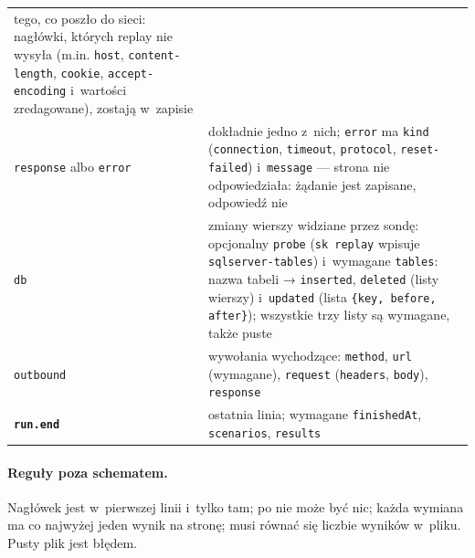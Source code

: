 {\begin{xltabular}{\linewidth}{@{}>{\raggedright\arraybackslash}p{3.6cm} >{\raggedright\arraybackslash}X@{}}
tego, co poszło do sieci: nagłówki, których replay nie wysyła (m.in. \texttt{host},
\texttt{content-length}, \texttt{cookie}, \texttt{accept-encoding} i~wartości zredagowane), zostają w~zapisie \\
\texttt{response} albo \texttt{error} & dokładnie jedno z~nich; \texttt{error} ma
\texttt{kind} (\texttt{connection}, \texttt{timeout}, \texttt{protocol},
\texttt{reset-failed}) i~\texttt{message} --- strona nie odpowiedziała: żądanie jest
zapisane, odpowiedź nie \\
\texttt{db} & zmiany wierszy widziane przez sondę: opcjonalny \texttt{probe} (\texttt{sk replay}
wpisuje \texttt{sqlserver-tables}) i~wymagane \texttt{tables}: nazwa tabeli →
\texttt{inserted}, \texttt{deleted} (listy wierszy) i~\texttt{updated} (lista
\texttt{\{key, before, after\}}); wszystkie trzy listy są wymagane, także puste \\
\texttt{outbound} & wywołania wychodzące: \texttt{method}, \texttt{url} (wymagane),
\texttt{request} (\texttt{headers}, \texttt{body}), \texttt{response} \\
\midrule
\textbf{\texttt{run.end}} & ostatnia linia; wymagane \texttt{finishedAt}, \texttt{scenarios},
\texttt{results} \\
\end{xltabular}
}

\paragraph{Reguły poza schematem.} Nagłówek jest w~pierwszej linii i~tylko tam; po
 nie może być nic; każda wymiana ma co najwyżej jeden wynik na stronę;
 musi równać się liczbie wyników w~pliku. Pusty plik jest błędem.

